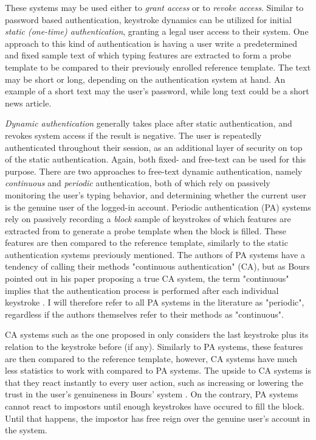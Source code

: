 \documentclass[informationsecurity]{gucmasterproject}
\begin{document}
These systems may be used either to \textit{grant access} or to \textit{revoke access}.
Similar to password based authentication, keystroke dynamics can be utilized for initial \textit{static (one-time) authentication}, granting a legal user access to their system.
One approach to this kind of authentication is having a user write a predetermined and fixed sample text of which typing features are extracted to form a probe template to be compared to their previously enrolled reference template.
The text may be short or long, depending on the authentication system at hand.  
An example of a short text may the user's password, while long text could be a short news article.

\textit{Dynamic authentication} generally takes place after static authentication, and revokes system access if the result is negative.
The user is repeatedly authenticated throughout their session, as an additional layer of security on top of the static authentication.
Again, both fixed- and free-text can be used for this purpose.
There are two approaches to free-text dynamic authentication, namely \textit{continuous} and \textit{periodic} authentication, both of which rely on passively monitoring the user's typing behavior, and determining whether the current user is the genuine user of the logged-in account.
Periodic authentication (PA) systems rely on passively recording a \textit{block} sample of keystrokes of which features are extracted from to generate a probe template when the block is filled.
These features are then compared to the reference template, similarly to the static authentication systems previously mentioned.
The authors of PA systems have a tendency of calling their methods "continuous authentication" (CA), but as Bours pointed out in his paper proposing a true CA system, the term "continuous" implies that the authentication process is performed after each individual keystroke \cite{BOURS201236}.
I will therefore refer to all PA systems in the literature as "periodic", regardless if the authors themselves refer to their methods as "continuous".

CA systems such as the one proposed in \cite{BOURS201236} only considers the last keystroke plus its relation to the keystroke before (if any).
Similarly to PA systems, these features are then compared to the reference template, however, CA systems have much less statistics to work with compared to PA systems.
The upside to CA systems is that they react instantly to every user action, such as increasing or lowering the trust in the user's genuineness in Bours' system \cite{BOURS201236}.
On the contrary, PA systems cannot react to impostors until enough keystrokes have occured to fill the block.
Until that happens, the impostor has free reign over the genuine user's account in the system.
\end{document}
